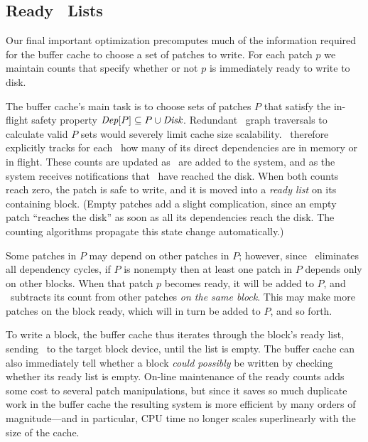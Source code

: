 
\subsection{Ready \ChDesc\ Lists}
\label{sec:patch:readylist}

\newcommand{\PReady}[1]{\ensuremath{#1.\textit{ready}}}

Our final important optimization precomputes much of the information
required for the buffer cache to choose a set of patches to write.
%
For each patch $p$ we maintain counts that specify whether or not $p$ is
immediately ready to write to disk.


The buffer cache's main task is to choose sets of patches $P$ that satisfy
the in-flight safety property $\PDepset{P} \subseteq P \cup \PDisk$.
%
Redundant \chdesc\ graph traversals to calculate valid $P$ sets would
severely limit cache size scalability.
%
\Kudos\ therefore explicitly tracks for each \chdesc\ how many of its
direct dependencies are in memory or in flight.
%
These counts are updated as \patches\ are added to the system, and as the
system receives notifications that \patches\ have reached the disk.
%
When both counts reach zero, the patch is safe to write, and it is moved
into a \emph{ready list} on its containing block.
%
(Empty patches add a slight complication, since an empty patch ``reaches
the disk'' as soon as all its dependencies reach the disk.  The counting
algorithms propagate this state change automatically.)


Some patches in $P$ may depend on other patches in $P$; however, since
\Kudos\ eliminates all dependency cycles, if $P$ is nonempty then at least
one patch in $P$ depends only on other blocks.
%
When that patch $p$ becomes ready, it will be added to $P$, and \Kudos\
subtracts its count from other patches \emph{on the same block}.
%
This may make more patches on the block ready, which will in turn be added
to $P$, and so forth.


To write a block, the buffer cache thus iterates through the block's ready
list, sending \chdescs\ to the target block device, until the list is
empty. 
%
The buffer cache can also immediately tell whether a block \emph{could
possibly} be written by checking whether its ready list is empty.
%
On-line maintenance of the ready counts adds some cost to several patch
manipulations, but since it saves so much duplicate work in the buffer
cache the resulting system is more efficient by many orders of
magnitude---and in particular, CPU time no longer scales superlinearly with
the size of the cache.


